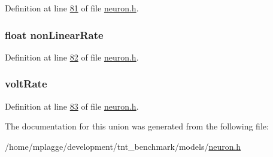 Definition at line \hyperlink{neuron_8h_source_l00081}{81} of file \hyperlink{neuron_8h_source}{neuron.\+h}.

\hypertarget{unionreset_rate_a54aaba14ce85fd9c5d7b385d98727e36}{}
\subsubsection[{non\+Linear\+Rate}]{\setlength{\rightskip}{0pt plus 5cm}float non\+Linear\+Rate}\label{unionreset_rate_a54aaba14ce85fd9c5d7b385d98727e36}


Definition at line \hyperlink{neuron_8h_source_l00082}{82} of file \hyperlink{neuron_8h_source}{neuron.\+h}.

\hypertarget{unionreset_rate_a5a9af6c017d8b70e4db9283f2f7e726b}{}
\subsubsection[{volt\+Rate}]{ volt\+Rate}\label{unionreset_rate_a5a9af6c017d8b70e4db9283f2f7e726b}


Definition at line \hyperlink{neuron_8h_source_l00083}{83} of file \hyperlink{neuron_8h_source}{neuron.\+h}.



The documentation for this union was generated from the following file\+:\begin{DoxyCompactItemize}
\item 
/home/mplagge/development/tnt\+\_\+benchmark/models/\hyperlink{neuron_8h}{neuron.\+h}\end{DoxyCompactItemize}

